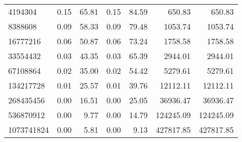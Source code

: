 \begin{tabular}{lrrrrrr}
4194304    &        0.15 &         65.81 &           0.15 &        84.59 &           650.83 &          650.83 \\
8388608    &        0.09 &         58.33 &           0.09 &        79.48 &          1053.74 &         1053.74 \\
16777216   &        0.06 &         50.87 &           0.06 &        73.24 &          1758.58 &         1758.58 \\
33554432   &        0.03 &         43.35 &           0.03 &        65.39 &          2944.01 &         2944.01 \\
67108864   &        0.02 &         35.00 &           0.02 &        54.42 &          5279.61 &         5279.61 \\
134217728  &        0.01 &         25.57 &           0.01 &        39.76 &         12112.11 &        12112.11 \\
268435456  &        0.00 &         16.51 &           0.00 &        25.05 &         36936.47 &        36936.47 \\
536870912  &        0.00 &          9.77 &           0.00 &        14.79 &        124245.09 &       124245.09 \\
1073741824 &        0.00 &          5.81 &           0.00 &         9.13 &        427817.85 &       427817.85 \\
\bottomrule
\end{tabular}
